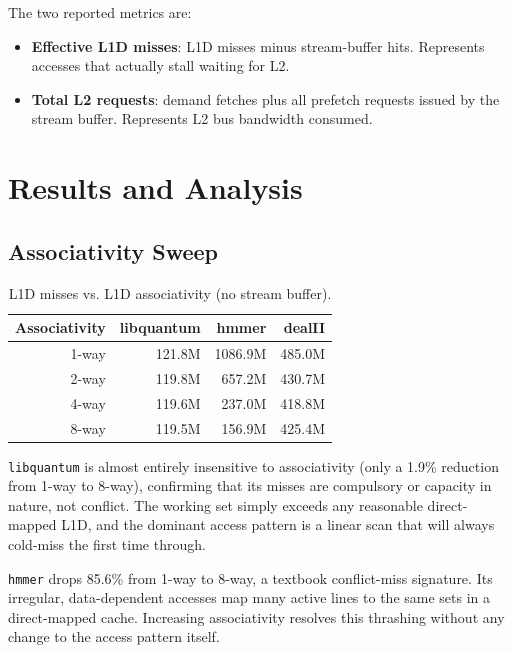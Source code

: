 \documentclass[11pt,letterpaper]{article}
\begin{document}
The two reported metrics are:
\begin{itemize}
    \item \textbf{Effective L1D misses}: L1D misses minus stream-buffer hits.
          Represents accesses that actually stall waiting for L2.
    \item \textbf{Total L2 requests}: demand fetches plus all prefetch
          requests issued by the stream buffer. Represents L2 bus bandwidth
          consumed.
\end{itemize}

\section{Results and Analysis}

\subsection{Associativity Sweep}

\begin{table}[H]
\centering
\caption{L1D misses vs. L1D associativity (no stream buffer).}
\begin{tabular}{rrrr}
\toprule
Associativity & libquantum & hmmer & dealII \\
\midrule
1-way & 121.8M & 1086.9M & 485.0M \\
2-way & 119.8M &  657.2M & 430.7M \\
4-way & 119.6M &  237.0M & 418.8M \\
8-way & 119.5M &  156.9M & 425.4M \\
\bottomrule
\end{tabular}
\end{table}

\texttt{libquantum} is almost entirely insensitive to associativity (only a
1.9\% reduction from 1-way to 8-way), confirming that its misses are
compulsory or capacity in nature, not conflict. The working set simply exceeds
any reasonable direct-mapped L1D, and the dominant access pattern is a linear
scan that will always cold-miss the first time through.

\texttt{hmmer} drops 85.6\% from 1-way to 8-way, a textbook conflict-miss
signature. Its irregular, data-dependent accesses map many active lines to the
same sets in a direct-mapped cache. Increasing associativity resolves this
thrashing without any change to the access pattern itself.
\end{document}
